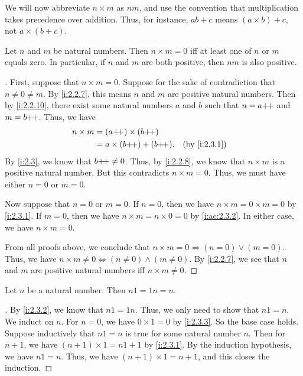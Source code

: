 \begin{note}
  We will now abbreviate \(n \times m\) as \(nm\), and use the convention that multiplication takes precedence over addition.
  Thus, for instance, \(ab + c\) means \((a \times b) + c\), not \(a \times (b + c)\).
\end{note}

\begin{lem}\label{i:2.3.3}
  Let \(n\) and \(m\) be natural numbers.
  Then \(n \times m = 0\) iff at least one of \(n\) or \(m\) equals zero.
  In particular, if \(n\) and \(m\) are both positive, then \(nm\) is also positive.
\end{lem}

\begin{proof}[]
  First, suppose that \(n \times m = 0\).
  Suppose for the sake of contradiction that \(n \neq 0 \neq m\).
  By \cref{i:2.2.7}, this means \(n\) and \(m\) are positive natural numbers.
  Then by \cref{i:2.2.10}, there exist some natural numbers \(a\) and \(b\) such that \(n = a{+}\!{+}\) and \(m = b{+}\!{+}\).
  Thus, we have
  \begin{align*}
    n \times m & = (a\pp) \times (b\pp)                        \\
               & = a \times (b\pp) + (b\pp). &  & \by{i:2.3.1}
  \end{align*}
  By \cref{i:2.3}, we know that \(b{+}\!{+} \neq 0\).
  Thus, by \cref{i:2.2.8}, we know that \(n \times m\) is a positive natural number.
  But this contradicts \(n \times m = 0\).
  Thus, we must have either \(n = 0\) or \(m = 0\).

  Now suppose that \(n = 0\) or \(m = 0\).
  If \(n = 0\), then we have \(n \times m = 0 \times m = 0\) by \cref{i:2.3.1}.
  If \(m = 0\), then we have \(n \times m = n \times 0 = 0\) by \cref{i:ac:2.3.2}.
  In either case, we have \(n \times m = 0\).

  From all proofs above, we conclude that \(n \times m = 0 \iff (n = 0) \lor (m = 0)\).
  Thus, we have \(n \times m \neq 0 \iff (n \neq 0) \land (m \neq 0)\).
  By \cref{i:2.2.7}, we see that \(n\) and \(m\) are positive natural numbers iff \(n \times m \neq 0\).
\end{proof}

\begin{ac}\label{i:ac:2.3.4}
  Let \(n\) be a natural number.
  Then \(n1 = 1n = n\).
\end{ac}

\begin{proof}[]
  By \cref{i:2.3.2}, we know that \(n1 = 1n\).
  Thus, we only need to show that \(n1 = n\).
  We induct on \(n\).
  For \(n = 0\), we have \(0 \times 1 = 0\) by \cref{i:2.3.3}.
  So the base case holds.
  Suppose inductively that \(n1 = n\) is true for some natural number \(n\).
  Then for \(n + 1\), we have \((n + 1) \times 1 = n1 + 1\) by \cref{i:2.3.1}.
  By the induction hypothesis, we have \(n1 = n\).
  Thus, we have \((n + 1) \times 1 = n + 1\), and this closes the induction.
\end{proof}

